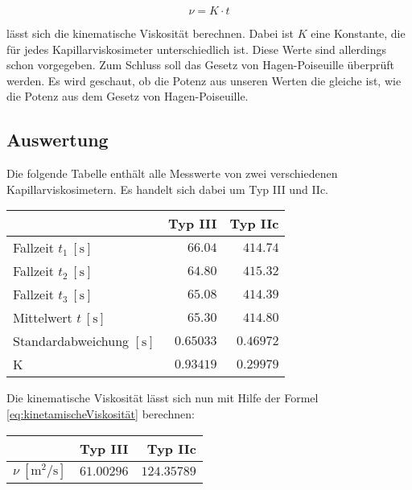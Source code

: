             \begin{equation}
                \nu = K \cdot t
                \label{eq:kinetamischeViskosität}
            \end{equation}

            lässt sich die kinematische Viskosität berechnen. Dabei ist $K$ eine Konstante, die für jedes Kapillarviskosimeter unterschiedlich ist. Diese Werte sind allerdings schon vorgegeben. Zum Schluss soll das Gesetz von Hagen-Poiseuille überprüft werden. Es wird geschaut, ob die Potenz aus unseren Werten die gleiche ist, wie die Potenz aus dem Gesetz von Hagen-Poiseuille.

        \subsection{Auswertung}

            Die folgende Tabelle enthält alle Messwerte von zwei verschiedenen Kapillarviskosimetern. Es handelt sich dabei um Typ III und IIc.

            \begin{table}[H]
                \centering
                \begin{tabular}{|l||r|r|}
                    \hline
                    & Typ III & Typ IIc\\
                    \hline\hline
                    Fallzeit $t_{1}\ [\mathrm{s}]$ & $66.04$ & $414.74$\\
                    Fallzeit $t_{2}\ [\mathrm{s}]$ & $64.80$ & $415.32$\\
                    Fallzeit $t_{3}\ [\mathrm{s}]$ & $65.08$ & $414.39$\\
                    \hline
                    Mittelwert $t\ [\mathrm{s}]$ & $65.30$ & $414.80$\\
                    Standardabweichung $[\mathrm{s}]$ & $0.65033$ & $0.46972$\\
                    \hline
                    K & $0.93419$ & $0.29979$\\
                    \hline
                \end{tabular}
            \end{table}

            Die kinematische Viskosität lässt sich nun mit Hilfe der Formel \ref{eq:kinetamischeViskosität} berechnen:

            \begin{table}[H]
                \centering
                \begin{tabular}{|l||r|r|}
                    \hline
                    & Typ III & Typ IIc\\
                    \hline\hline
                    $\nu\ [\mathrm{m^{2}/s}]$ & $61.00296$ & $124.35789$\\
                    \hline
                \end{tabular}
            \end{table}

